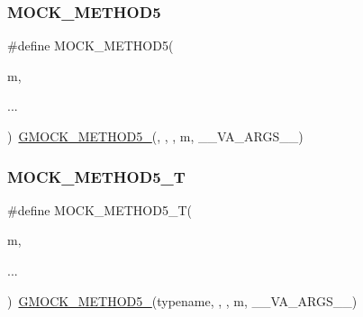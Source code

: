 \mbox{\label{_obj__test_2lib_2googletest-release-1_88_81_2googlemock_2include_2gmock_2gmock-generated-function-mockers_8h_a9b83bed95e89664e61d3a36174de0052}} 
\subsubsection{\texorpdfstring{MOCK\_METHOD5}{MOCK\_METHOD5}}
{\footnotesize\ttfamily \#define M\+O\+C\+K\+\_\+\+M\+E\+T\+H\+O\+D5(\begin{DoxyParamCaption}\item[{}]{m,  }\item[{}]{... }\end{DoxyParamCaption})~\mbox{\hyperlink{_obj__test_2lib_2googletest-release-1_88_81_2googlemock_2include_2gmock_2gmock-generated-function-mockers_8h_a9e3ecd392499ab19a4a6d3adcabf56f6}{G\+M\+O\+C\+K\+\_\+\+M\+E\+T\+H\+O\+D5\+\_\+}}(, , , m, \+\_\+\+\_\+\+V\+A\+\_\+\+A\+R\+G\+S\+\_\+\+\_\+)}

\mbox{\label{_obj__test_2lib_2googletest-release-1_88_81_2googlemock_2include_2gmock_2gmock-generated-function-mockers_8h_a3566f9bd057c5cee1841f55cbf685947}} 
\subsubsection{\texorpdfstring{MOCK\_METHOD5\_T}{MOCK\_METHOD5\_T}}
{\footnotesize\ttfamily \#define M\+O\+C\+K\+\_\+\+M\+E\+T\+H\+O\+D5\+\_\+T(\begin{DoxyParamCaption}\item[{}]{m,  }\item[{}]{... }\end{DoxyParamCaption})~\mbox{\hyperlink{_obj__test_2lib_2googletest-release-1_88_81_2googlemock_2include_2gmock_2gmock-generated-function-mockers_8h_a9e3ecd392499ab19a4a6d3adcabf56f6}{G\+M\+O\+C\+K\+\_\+\+M\+E\+T\+H\+O\+D5\+\_\+}}(typename, , , m, \+\_\+\+\_\+\+V\+A\+\_\+\+A\+R\+G\+S\+\_\+\+\_\+)}

